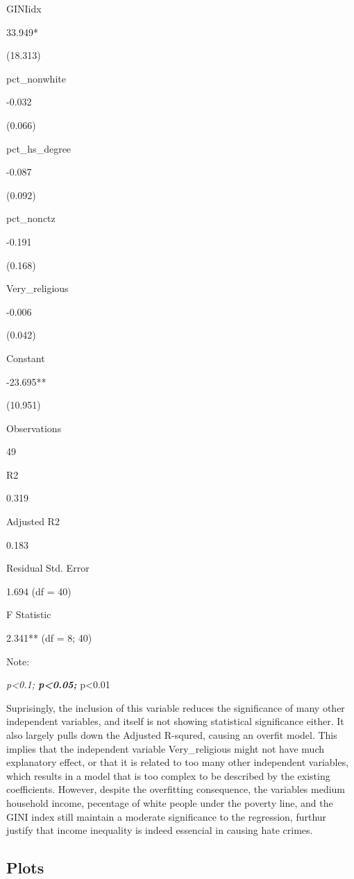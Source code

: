 \documentclass[]{article}
\begin{document}
GINIidx

33.949*

(18.313)

pct\_nonwhite

-0.032

(0.066)

pct\_hs\_degree

-0.087

(0.092)

pct\_nonctz

-0.191

(0.168)

Very\_religious

-0.006

(0.042)

Constant

-23.695**

(10.951)

Observations

49

R2

0.319

Adjusted R2

0.183

Residual Std. Error

1.694 (df = 40)

F Statistic

2.341** (df = 8; 40)

Note:

\emph{p\textless{}0.1; \textbf{p\textless{}0.05; }}p\textless{}0.01

Suprisingly, the inclusion of this variable reduces the significance of
many other independent variables, and itself is not showing statistical
significance either. It also largely pulls down the Adjusted R-squred,
causing an overfit model. This implies that the independent variable
Very\_religious might not have much explanatory effect, or that it is
related to too many other independent variables, which results in a
model that is too complex to be described by the existing coefficients.
However, despite the overfitting consequence, the variables medium
household income, pecentage of white people under the poverty line, and
the GINI index still maintain a moderate significance to the regression,
furthur justify that income inequality is indeed essencial in causing
hate crimes.

\hypertarget{plots}{%
\subsection{Plots}\label{plots}}
\end{document}
